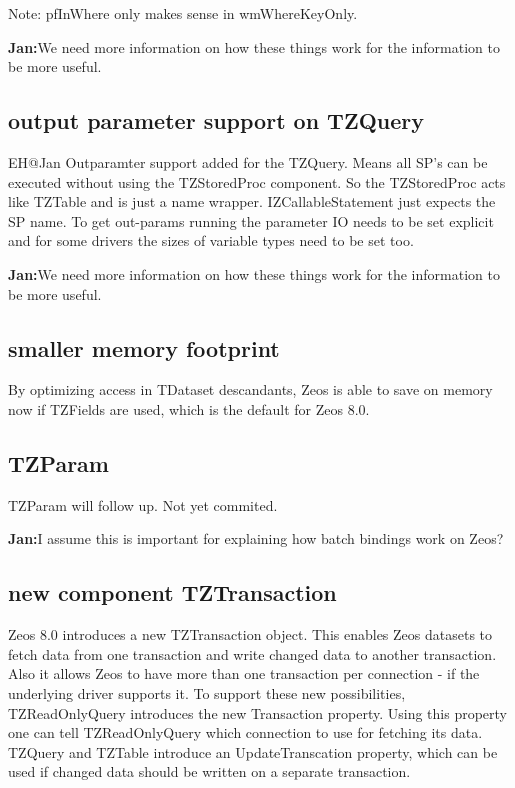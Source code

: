 \documentclass[a4paper,12pt,oneside]{article}
\begin{document}
Note: pfInWhere only makes sense in wmWhereKeyOnly.

\textbf{Jan:}We need more information on how these things work for the information to be more useful.

\subsection{output parameter support on TZQuery}
EH@Jan Outparamter support added for the TZQuery.
Means all SP's can be executed without using the TZStoredProc component.
So the TZStoredProc acts like TZTable and is just a name wrapper.
IZCallableStatement just expects the SP name.
To get out-params running the parameter IO needs to be set explicit and for some drivers the sizes of variable types need to be set too.

\textbf{Jan:}We need more information on how these things work for the information to be more useful.

\subsection{smaller memory footprint}
By optimizing access in TDataset descandants, Zeos is able to save on memory now if TZFields are used, which is the default for Zeos 8.0.

\subsection{TZParam}

TZParam will follow up. 
Not yet commited.

\textbf{Jan:}I assume this is important for explaining how batch bindings work on Zeos?

\subsection{new component TZTransaction}

Zeos 8.0 introduces a new TZTransaction object.
This enables Zeos datasets to fetch data from one transaction and write changed data to another transaction.
Also it allows Zeos to have more than one transaction per connection - if the underlying driver supports it.
To support these new possibilities, TZReadOnlyQuery introduces the new Transaction property.
Using this property one can tell TZReadOnlyQuery which connection to use for fetching its data.
TZQuery and TZTable introduce an UpdateTranscation property, which can be used if changed data should be written on a separate transaction.
\end{document}
